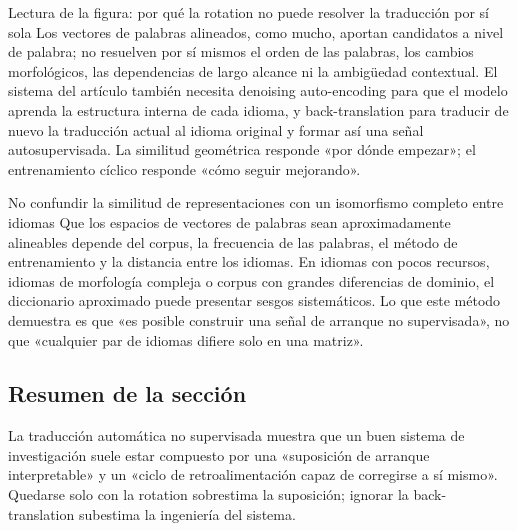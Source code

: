 \documentclass[a4paper]{article}
\begin{document}
\begin{knowledgebox}{Lectura de la figura: por qué la rotation no puede resolver la traducción por sí sola}
Los vectores de palabras alineados, como mucho, aportan candidatos a nivel de palabra; no resuelven por sí mismos el orden de las palabras, los cambios morfológicos, las dependencias de largo alcance ni la ambigüedad contextual. El sistema del artículo también necesita denoising auto-encoding para que el modelo aprenda la estructura interna de cada idioma, y back-translation para traducir de nuevo la traducción actual al idioma original y formar así una señal autosupervisada. La similitud geométrica responde «por dónde empezar»; el entrenamiento cíclico responde «cómo seguir mejorando».
\end{knowledgebox}

\begin{warningbox}{No confundir la similitud de representaciones con un isomorfismo completo entre idiomas}
Que los espacios de vectores de palabras sean aproximadamente alineables depende del corpus, la frecuencia de las palabras, el método de entrenamiento y la distancia entre los idiomas. En idiomas con pocos recursos, idiomas de morfología compleja o corpus con grandes diferencias de dominio, el diccionario aproximado puede presentar sesgos sistemáticos. Lo que este método demuestra es que «es posible construir una señal de arranque no supervisada», no que «cualquier par de idiomas difiere solo en una matriz».
\end{warningbox}


\subsection{Resumen de la sección}

La traducción automática no supervisada muestra que un buen sistema de investigación suele estar compuesto por una «suposición de arranque interpretable» y un «ciclo de retroalimentación capaz de corregirse a sí mismo». Quedarse solo con la rotation sobrestima la suposición; ignorar la back-translation subestima la ingeniería del sistema.
\end{document}
